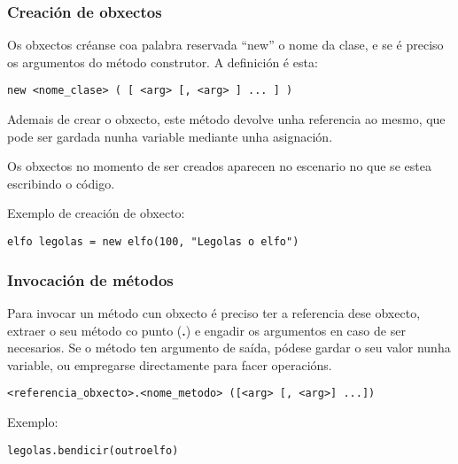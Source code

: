 \subsubsection{Creación de obxectos}
Os obxectos créanse coa palabra reservada ``new'' o nome da clase, e se é
preciso os argumentos do método construtor. A definición é esta:
\begin{lstlisting}
new <nome_clase> ( [ <arg> [, <arg> ] ... ] )
\end{lstlisting} 
\par Ademais de crear o obxecto, este método devolve unha referencia ao mesmo,
que pode ser gardada nunha variable mediante unha asignación.
\par
Os obxectos no momento de ser creados aparecen no escenario no que se
estea escribindo o código.
\par Exemplo de creación de obxecto:
\begin{lstlisting}
elfo legolas = new elfo(100, "Legolas o elfo")
\end{lstlisting}

\subsubsection{Invocación de métodos}
Para invocar un método cun obxecto é preciso ter a referencia dese obxecto,
extraer o seu método co punto ({\bf .}) e engadir os argumentos en caso de ser
necesarios. Se o método ten argumento de saída, pódese gardar o seu valor nunha
variable, ou empregarse directamente para facer operacións.
\begin{lstlisting}
<referencia_obxecto>.<nome_metodo> ([<arg> [, <arg>] ...])
\end{lstlisting} 
\par Exemplo:
\begin{lstlisting}
legolas.bendicir(outroelfo)
\end{lstlisting}


